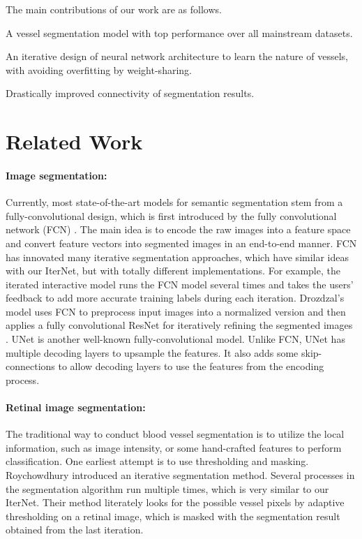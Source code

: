 \documentclass[10pt,twocolumn,letterpaper]{article}
\begin{document}
The main contributions of our work are as follows.
\begin{compactitem}
	\item A vessel segmentation model with top performance over all mainstream datasets.
	\item An iterative design of neural network architecture to learn the nature of vessels, with avoiding overfitting by weight-sharing.
	\item Drastically improved connectivity of segmentation results.
\end{compactitem}




\section{Related Work}\label{Related_Works_section}

\paragraph{Image segmentation:} 
Currently, most state-of-the-art models \cite{DOLZ2018456,Zhang_2018_CVPR,Jegou_2017_CVPR_Workshops} for semantic segmentation stem from a fully-convolutional design, which is first introduced by the fully convolutional network (FCN) \cite{Long_2015_CVPR}.
The main idea is to encode the raw images into a feature space and convert feature vectors into segmented images in an end-to-end manner. FCN has innovated many iterative segmentation approaches, which have similar ideas with our IterNet, but with totally different implementations. For example, the iterated interactive model \cite{Amrehn:2017:UIA:3309883.3309905} runs the FCN model several times and takes the users' feedback to add more accurate training labels during each iteration. Drozdzal's model uses FCN to preprocess input images into a normalized version and then applies a fully convolutional ResNet for iteratively refining the segmented images \cite{DROZDZAL20181}.
UNet \cite{UNet} is another well-known fully-convolutional model. Unlike FCN, UNet has multiple decoding layers to upsample the features. It also adds some skip-connections to allow decoding layers to use the features from the encoding process.


\paragraph{Retinal image segmentation:}

The traditional way to conduct blood vessel segmentation is to utilize the local information, such as image intensity, or some hand-crafted features to perform classification. One earliest attempt is to use thresholding and masking. Roychowdhury \etal \cite{7042289} introduced an iterative segmentation method. Several processes in the segmentation algorithm run multiple times, which is very similar to our IterNet. Their method literately looks for the possible vessel pixels by adaptive thresholding on a retinal image, which is masked with the segmentation result obtained from the last iteration. 
\end{document}
